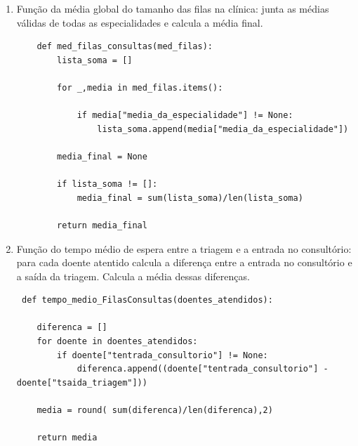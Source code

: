 \documentclass[12pt,a4paper]{article} %
\begin{document}
\begin{enumerate}
\begin{verbatim}
    med_filas = {}

    def calcula_media(fila):
        media = None
        if len(fila) != 0:
            media = sum(fila)/len(fila)
        return media

    for esp, fila in tam_filas.items():

        med_filas[esp] = {
            "media_sem_consulta": calcula_media(fila.get("sem_consulta", [])),
            "media_com_consulta": calcula_media(fila.get("com_consulta", [])),}
        if med_filas[esp]["media_com_consulta"] == None and med_filas[esp]["media_sem_consulta"] == None:
            med_filas[esp]["media_da_especialidade"] = None
        elif med_filas[esp]["media_com_consulta"] == None:
            med_filas[esp]["media_da_especialidade"] = med_filas[esp]["media_sem_consulta"]
        elif med_filas[esp]["media_sem_consulta"] == None:
            med_filas[esp]["media_da_especialidade"] = med_filas[esp]["media_com_consulta"]
        else:
            med_filas[esp]["media_da_especialidade"] = (med_filas[esp]["media_sem_consulta"] + med_filas[esp]["media_com_consulta"])/2

    return med_filas
    \end{verbatim}

        \item Função da média global do tamanho das filas na clínica: junta as médias válidas de todas as especialidades e calcula a média final. \hypertarget{4}{}
    \begin{verbatim}
    def med_filas_consultas(med_filas):
        lista_soma = []
    
        for _,media in med_filas.items():
    
            if media["media_da_especialidade"] != None:
                lista_soma.append(media["media_da_especialidade"])
        
        media_final = None
    
        if lista_soma != []:
            media_final = sum(lista_soma)/len(lista_soma)
        
        return media_final
    \end{verbatim}

        \item Função do tempo médio de espera entre a triagem e a entrada no consultório: para cada doente atentido calcula a diferença entre a entrada no consultório e a saída da triagem. Calcula a média dessas diferenças. \hypertarget{5}{}
    \begin{verbatim}
 def tempo_medio_FilasConsultas(doentes_atendidos):

    diferenca = []
    for doente in doentes_atendidos:
        if doente["tentrada_consultorio"] != None:
            diferenca.append((doente["tentrada_consultorio"] - doente["tsaida_triagem"]))

    media = round( sum(diferenca)/len(diferenca),2)

    return media
    \end{verbatim}
    \end{enumerate}
    \newpage
\end{document}

